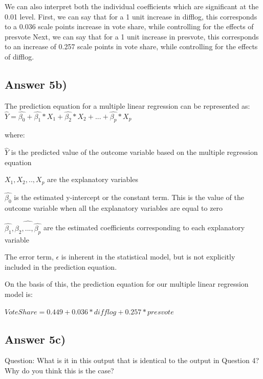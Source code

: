 \documentclass{article}
\begin{document}
We can also interpret both the individual coefficients which are significant at the 0.01 level. 
First, we can say that for a 1 unit increase in difflog, this corresponds to a 0.036 scale points increase in vote share, while controlling for the effects of presvote 
Next, we can say that for a 1 unit increase in presvote, this corresponds to an increase of 0.257 scale points in vote share, while controlling for the effects of difflog.

\subsection{Answer 5b)}
The prediction equation for a multiple linear regression can be represented as:
\begin{math} \hat{Y} = \hat{\beta_0} + \hat{\beta_1} * X_1 + \hat{\beta_2} * X_2 + ... + \hat{\beta_p} * X_p \end{math} 

where:

\noindent $\hat{Y}$ is the predicted value of the outcome variable based on the multiple regression equation

\noindent $X_1, X_2,..,X_p$ are the explanatory variables

\noindent $\hat{\beta_0}$ is the estimated y-intercept or the constant term. This is the value of the outcome variable when all the explanatory variables are equal to zero

\noindent $\hat{\beta_1},\hat{\beta_2,...,\hat{\beta_p}}$ are the estimated coefficients corresponding to each explanatory variable

\noindent The error term, $\epsilon$ is inherent in the statistical model, but is not explicitly included in the prediction equation.

\vspace{0.3cm}

\noindent On the basis of this, the prediction equation for our multiple linear regression model is:

\begin{math}
    Vote Share = 0.449 + 0.036 * difflog + 0.257 * pres vote 
\end{math}

\subsection{Answer 5c)}
Question: What is it in this output that is identical to the output in Question 4? Why do you think this is the case?
\vspace{0.2cm}
\end{document}
